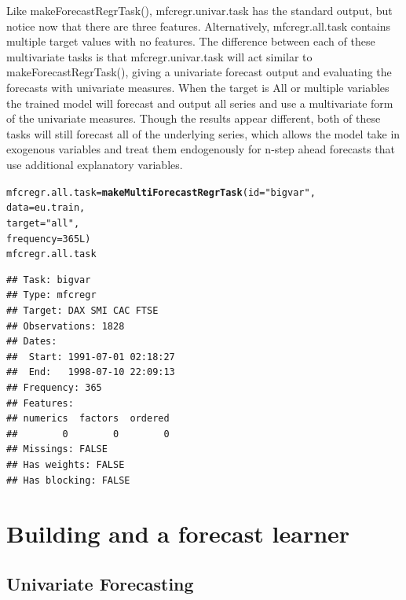 \documentclass[12pt]{article}\usepackage[]{graphicx}\usepackage[]{color}
\makeatletter
\newcommand{\hlnum}[1]{\textcolor[rgb]{0.686,0.059,0.569}{#1}}%
\newcommand{\hlstr}[1]{\textcolor[rgb]{0.192,0.494,0.8}{#1}}%
\newcommand{\hlstd}[1]{\textcolor[rgb]{0.345,0.345,0.345}{#1}}%
\newcommand{\hlkwb}[1]{\textcolor[rgb]{0.69,0.353,0.396}{#1}}%
\newcommand{\hlkwc}[1]{\textcolor[rgb]{0.333,0.667,0.333}{#1}}%
\newcommand{\hlkwd}[1]{\textcolor[rgb]{0.737,0.353,0.396}{\textbf{#1}}}%
\newenvironment{kframe}{%
 \def\at@end@of@kframe{}%
 \ifinner\ifhmode%
  \def\at@end@of@kframe{\end{minipage}}%
  \begin{minipage}{\columnwidth}%
 \fi\fi%
 \def\FrameCommand##1{\hskip\@totalleftmargin \hskip-\fboxsep
 \colorbox{shadecolor}{##1}\hskip-\fboxsep
     \hskip-\linewidth \hskip-\@totalleftmargin \hskip\columnwidth}%
 \MakeFramed {\advance\hsize-\width
   \@totalleftmargin\z@ \linewidth\hsize
   \@setminipage}}%
 {\par\unskip\endMakeFramed%
 \at@end@of@kframe}
\newenvironment{knitrout}{}{} %
\theoremstyle{definition}
\newcommand\code{\@codex}
\def\@codex#1{{\normalfont\ttfamily\hyphenchar\font=-1 #1}}
\makeatother
\begin{document}
Like \code{makeForecastRegrTask()}, \code{mfcregr.univar.task} has the standard output, but notice now that there are three features. Alternatively, \code{mfcregr.all.task} contains multiple target values with no features. The difference between each of these multivariate tasks is that \code{mfcregr.univar.task} will act similar to \code{makeForecastRegrTask()}, giving a univariate forecast output and evaluating the forecasts with univariate measures. When the target is \code{All} or multiple variables the trained model will forecast and output all series and use a multivariate form of the univariate measures. Though the results appear different, both of these tasks will still forecast all of the underlying series, which allows the model take in exogenous variables and treat them endogenously for n-step ahead forecasts that use additional explanatory variables.

\singlespacing
\begin{knitrout}
\color{fgcolor}\begin{kframe}
\begin{alltt}
\hlstd{mfcregr.all.task} \hlkwb{=} \hlkwd{makeMultiForecastRegrTask}\hlstd{(}\hlkwc{id} \hlstd{=} \hlstr{"bigvar"}\hlstd{,}
                                      \hlkwc{data} \hlstd{= eu.train,}
                                      \hlkwc{target} \hlstd{=} \hlstr{"all"}\hlstd{,}
                                      \hlkwc{frequency} \hlstd{=} \hlnum{365L}\hlstd{)}
\hlstd{mfcregr.all.task}
\end{alltt}
\begin{verbatim}
## Task: bigvar
## Type: mfcregr
## Target: DAX SMI CAC FTSE
## Observations: 1828
## Dates:
##  Start: 1991-07-01 02:18:27 
##  End:   1998-07-10 22:09:13
## Frequency: 365
## Features:
## numerics  factors  ordered 
##        0        0        0 
## Missings: FALSE
## Has weights: FALSE
## Has blocking: FALSE
\end{verbatim}
\end{kframe}
\end{knitrout}
\doublespacing

\section{Building and a forecast learner}
\label{seq:build}
\subsection{Univariate Forecasting}
\label{seq:buildAndTuneUni}
\end{document}
